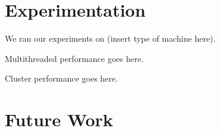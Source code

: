 \documentclass[times, leqno,twocolumn]{article}
\begin{document}






\section{Experimentation}

We ran our experiments on (insert type of machine here).

Multithreaded performance goes here.

Cluster performance goes here.

\section{Future Work}
\end{document}
